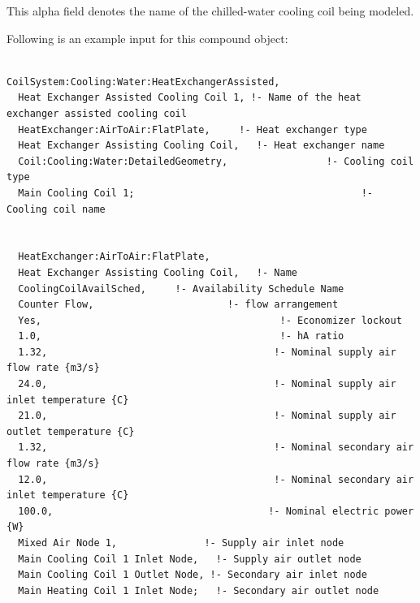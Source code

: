 This alpha field denotes the name of the chilled-water cooling coil being modeled.

Following is an example input for this compound object:

\begin{lstlisting}

CoilSystem:Cooling:Water:HeatExchangerAssisted,
  Heat Exchanger Assisted Cooling Coil 1, !- Name of the heat exchanger assisted cooling coil
  HeatExchanger:AirToAir:FlatPlate,     !- Heat exchanger type
  Heat Exchanger Assisting Cooling Coil,   !- Heat exchanger name
  Coil:Cooling:Water:DetailedGeometry,                 !- Cooling coil type
  Main Cooling Coil 1;                                       !- Cooling coil name


  HeatExchanger:AirToAir:FlatPlate,
  Heat Exchanger Assisting Cooling Coil,   !- Name
  CoolingCoilAvailSched,     !- Availability Schedule Name
  Counter Flow,                       !- flow arrangement
  Yes,                                         !- Economizer lockout
  1.0,                                         !- hA ratio
  1.32,                                       !- Nominal supply air flow rate {m3/s}
  24.0,                                       !- Nominal supply air inlet temperature {C}
  21.0,                                       !- Nominal supply air outlet temperature {C}
  1.32,                                       !- Nominal secondary air flow rate {m3/s}
  12.0,                                       !- Nominal secondary air inlet temperature {C}
  100.0,                                     !- Nominal electric power {W}
  Mixed Air Node 1,               !- Supply air inlet node
  Main Cooling Coil 1 Inlet Node,   !- Supply air outlet node
  Main Cooling Coil 1 Outlet Node, !- Secondary air inlet node
  Main Heating Coil 1 Inlet Node;   !- Secondary air outlet node





\end{lstlisting}
